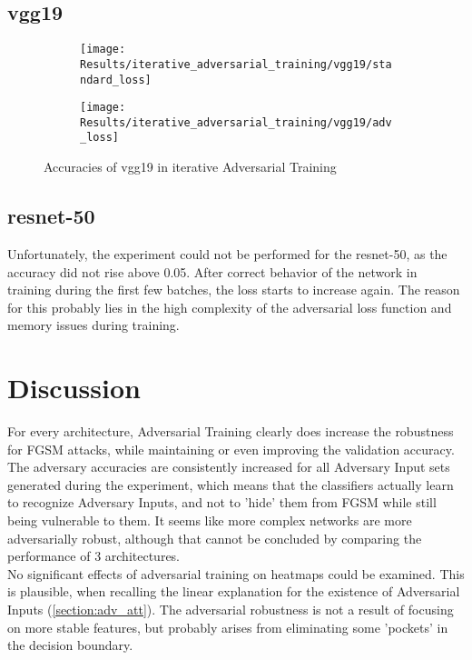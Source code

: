 \documentclass[draft,final]{vutinfth} %
\begin{document}
\subsection{vgg19}

\begin{figure}[h]
  \begin{subfigure}[b]{0.5\columnwidth}
		\centering
    \texttt{[image: Results/iterative\_adversarial\_training/vgg19/standard\_loss]}
    \label{fig:exp:iat:alex:data}
  \end{subfigure}
  \begin{subfigure}[b]{0.5\columnwidth}
		\centering
    \texttt{[image: Results/iterative\_adversarial\_training/vgg19/adv\_loss]}
    \label{fig:exp:iat:alex:loss}
  \end{subfigure}
  \caption{Accuracies of vgg19 in iterative Adversarial Training}
\end{figure}

\subsection{resnet-50}

Unfortunately, the experiment could not be performed for the resnet-50, as the accuracy did not rise above 0.05.
After correct behavior of the network in training during the first few batches, the loss starts to increase again.
The reason for this probably lies in the high complexity of the adversarial loss function and memory issues during training.

\section{Discussion}


For every architecture, Adversarial Training clearly does increase the robustness for FGSM attacks, while maintaining or even improving the validation accuracy.
The adversary accuracies are consistently increased for all Adversary Input sets generated during the experiment, which means that the classifiers actually learn to recognize
Adversary Inputs, and not to 'hide' them from FGSM while still being vulnerable to them.
It seems like more complex networks are more adversarially robust, although that cannot be concluded by comparing the performance of 3 architectures.\\

No significant effects of adversarial training on heatmaps could be examined.
This is plausible, when recalling the linear explanation for the existence of Adversarial Inputs (\ref{section:adv_att}).
The adversarial robustness is not a result of focusing on more stable features, but probably arises from eliminating some 'pockets' in the decision boundary.
\end{document}
